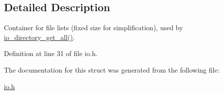 \subsection{Detailed Description}
Container for file lists (fixed size for simplification), used by \hyperlink{io_8c_adb8d68b54b043f5118a4cbfd49a8ec51}{io\+\_\+directory\+\_\+get\+\_\+all()}. 

Definition at line 31 of file io.\+h.



The documentation for this struct was generated from the following file\+:\begin{DoxyCompactItemize}
\item 
\hyperlink{io_8h}{io.\+h}\end{DoxyCompactItemize}
